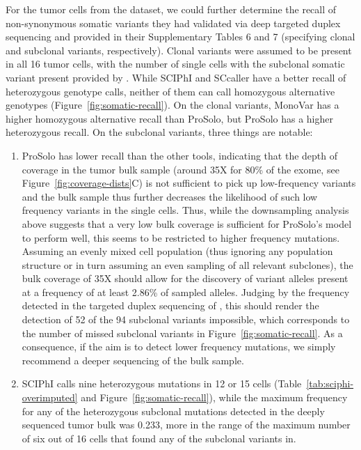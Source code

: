 \documentclass[authoryear,preprint,11pt]{scrartcl}
\begin{document}
For the tumor cells from the \cite{wang_clonal_2014} dataset, we could further determine the recall of non-synonymous somatic variants they had validated via deep targeted duplex sequencing and provided in their Supplementary Tables 6 and 7 (specifying clonal and subclonal variants, respectively).
Clonal variants were assumed to be present in all 16 tumor cells, with the number of single cells with the subclonal somatic variant present provided by \cite{wang_clonal_2014}.
While SCIPhI and SCcaller have a better recall of heterozygous genotype calls, neither of them can call homozygous alternative genotypes (Figure~\ref{fig:somatic-recall}).
On the clonal variants, MonoVar has a higher homozygous alternative recall than ProSolo, but ProSolo has a higher heterozygous recall.
On the subclonal variants, three things are notable:
\begin{enumerate}
  \item ProSolo has lower recall than the other tools, indicating that the depth of coverage in the tumor bulk sample (around 35X for 80\% of the exome, see Figure~\ref{fig:coverage-dists}C) is not sufficient to pick up low-frequency variants and the bulk sample thus further decreases the likelihood of such low frequency variants in the single cells.
  Thus, while the downsampling analysis above suggests that a very low bulk coverage is sufficient for ProSolo's model to perform well, this seems to be restricted to higher frequency mutations.
  Assuming an evenly mixed cell population (thus ignoring any population structure or in turn assuming an even sampling of all relevant subclones), the bulk coverage of 35X should allow for the discovery of variant alleles present at a frequency of at least 2.86\% of sampled alleles.
  Judging by the frequency detected in the targeted duplex sequencing of \cite{wang_clonal_2014}, this should render the detection of 52 of the 94 subclonal variants impossible, which corresponds to the number of missed subclonal variants in Figure~\ref{fig:somatic-recall}.
  As a consequence, if the aim is to detect lower frequency mutations, we simply recommend a deeper sequencing of the bulk sample.
  \item SCIPhI calls nine heterozygous mutations in 12 or 15 cells (Table~\ref{tab:sciphi-overimputed} and Figure~\ref{fig:somatic-recall}), while the maximum frequency for any of the heterozygous subclonal mutations detected in the deeply sequenced tumor bulk was 0.233, more in the range of the maximum number of six out of 16 cells that \cite{wang_clonal_2014} found any of the subclonal variants in.

\end{enumerate}
\end{document}
